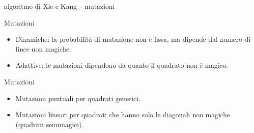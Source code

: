 \documentclass[10pt]{beamer}
\begin{document}
\begin{frame}{algoritmo di Xie e Kang -- mutazioni}



    \begin{block}{Mutazioni}
      \parbox{0.98\columnwidth}{
        \begin{itemize}
        \item Dinamiche: la probabilità di mutazione non è fissa, ma dipende dal numero di linee non magiche.
        \item Adattive: le mutazioni dipendono da quanto il quadrato non è magico.
        \end{itemize}
      }
    \end{block}
    
    \begin{block}{Mutazioni}
    	\parbox{0.98\columnwidth}{
    		\begin{itemize}
    			\item \alert{Mutazioni puntuali} per quadrati generici.
    			\item \alert{Mutazioni lineari} per quadrati che hanno solo le diagonali non magiche (\alert{quadrati semimagici}).
    		\end{itemize}
    	}
    \end{block}   
     

\end{frame}
\end{document}
